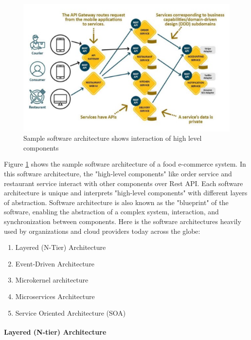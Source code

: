 \documentclass[12pt,a4paper]{article}
\begin{document}
\begin{figure}[H]
\centering
\includegraphics[scale=1.0]{software_arch_sample.PNG}
\caption{Sample software architecture shows interaction of high level components \cite{r17}}
\label{software_arch_sample}
\end{figure}

Figure \ref{software_arch_sample} shows the sample software architecture of a food e-commerce system. In this software architecture, the "high-level components" like order service and restaurant service interact with other components over Rest API. Each software architecture is unique and interprets "high-level components" with different layers of abstraction. Software architecture is also known as the "blueprint" of the software, enabling the abstraction of a complex system, interaction, and synchronization between components. \cite{r17} Here is the software architectures heavily used by organizations and cloud providers today across the globe: \\

\begin{enumerate}

\item Layered (N-Tier) Architecture
\item Event-Driven Architecture
\item Microkernel architecture
\item Microservices Architecture
\item Service Oriented Architecture (SOA)

\end{enumerate}

\paragraph{Layered (N-tier) Architecture}
\end{document}
